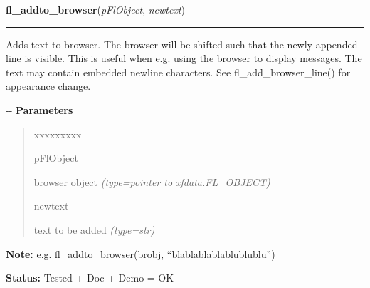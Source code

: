 \hspace{.8\funcindent}\begin{boxedminipage}{\funcwidth}

    \raggedright \textbf{fl\_addto\_browser}(\textit{pFlObject}, \textit{newtext})

    \vspace{-1.5ex}

    \rule{\textwidth}{0.5\fboxrule}
\setlength{\parskip}{2ex}

Adds text to browser. The browser will be shifted such that the newly
appended line is visible. This is useful when e.g. using the browser to
display messages. The text may contain embedded newline characters. See
fl\_add\_browser\_line() for appearance change.

-{}-
\setlength{\parskip}{1ex}
      \textbf{Parameters}
      \vspace{-1ex}

      \begin{quote}
        \begin{Ventry}{xxxxxxxxx}

          \item[pFlObject]


browser object
            {\it (type=pointer to xfdata.FL\_OBJECT)}

          \item[newtext]


text to be added
            {\it (type=str)}

        \end{Ventry}

      \end{quote}

\textbf{Note:} 
e.g. fl\_addto\_browser(brobj, ``blablablablablublublu'')


\textbf{Status:} 
Tested + Doc + Demo = OK


    \end{boxedminipage}

    \label{xformslib:flbrowser:fl_addto_browser_chars}

    \vspace{0.5ex}

